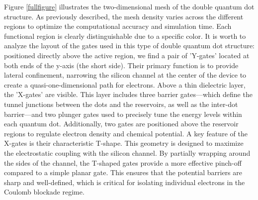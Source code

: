 Figure \ref{fullfigure} illustrates the two-dimensional mesh of the double quantum dot structure. As previously described, the mesh density varies across the different regions to optimize the computational accuracy and simulation time. Each functional region is clearly distinguishable due to a specific color.
It is worth to analyze the layout of the gates used in this type of double quantum dot structure: positioned directly above the active region, we find a pair of 'Y-gates' located at both ends of the y-axis (the short side). Their primary function is to provide lateral confinement, narrowing the silicon channel at the center of the device to create a quasi-one-dimensional path for electrons.
Above a thin dielectric layer, the 'X-gates' are visible. This layer includes three barrier gates—which define the tunnel junctions between the dots and the reservoirs, as well as the inter-dot barrier—and two plunger gates used to precisely tune the energy levels within each quantum dot. Additionally, two gates are positioned above the reservoir regions to regulate electron density and chemical potential.
A key feature of the X-gates is their characteristic T-shape. This geometry is designed to maximize the electrostatic coupling with the silicon channel. By partially wrapping around the sides of the channel, the T-shaped gates provide a more effective pinch-off compared to a simple planar gate. This ensures that the potential barriers are sharp and well-defined, which is critical for isolating individual electrons in the Coulomb blockade regime.
